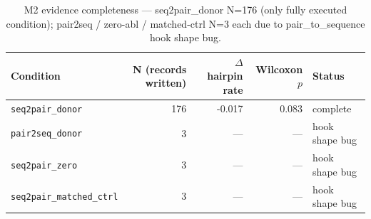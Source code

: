 
\begin{table}[t]
\centering
\caption{M2 evidence completeness --- seq2pair\_donor N=176 (only fully executed condition); pair2seq / zero-abl / matched-ctrl N=3 each due to pair\_to\_sequence hook shape bug.}
\label{tab:c2_conditions_status}
\begin{tabular}{lrrrl}
\toprule
Condition & N (records written) & $\Delta$ hairpin rate & Wilcoxon $p$ & Status \\
\midrule
\texttt{seq2pair\_donor} & 176 & -0.017 & 0.083 & complete \\
\texttt{pair2seq\_donor} & 3 & --- & --- & hook shape bug \\
\texttt{seq2pair\_zero} & 3 & --- & --- & hook shape bug \\
\texttt{seq2pair\_matched\_ctrl} & 3 & --- & --- & hook shape bug \\
\bottomrule
\end{tabular}
\end{table}
